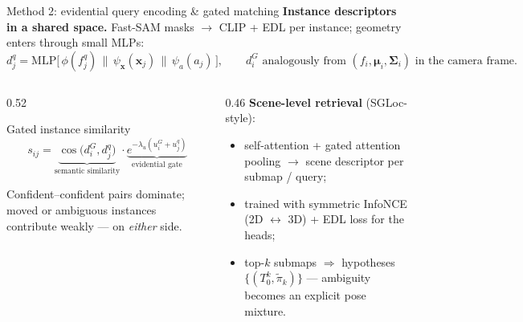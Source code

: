\documentclass[aspectratio=169,10pt]{beamer}
\begin{document}
\begin{frame}{Method 2: evidential query encoding \& gated matching}
  \textbf{Instance descriptors in a shared space.} Fast-SAM masks
  $\rightarrow$ CLIP + EDL per instance; geometry enters through small MLPs:
  \begin{equation*}
    d_j^q = \mathrm{MLP}\big[\,\phi(f_j^q) \,\|\, \psi_{\mathbf{x}}(\mathbf{x}_j)
    \,\|\, \psi_a(a_j)\,\big],
    \qquad
    d_i^G \text{ analogously from } (f_i, \bm\mu_i, \bm\Sigma_i)
    \text{ in the camera frame.}
  \end{equation*}
  \begin{columns}[T]
    \begin{column}{0.52\textwidth}
      \begin{block}{Gated instance similarity}
        \begin{equation*}
          s_{ij} =
          \underbrace{\cos\!\big(d_i^G, d_j^q\big)}_{\text{semantic similarity}}
          \cdot
          \underbrace{e^{-\lambda_u (u_i^G + u_j^q)}}_{\text{evidential gate}}
        \end{equation*}
      \end{block}
      \small Confident--confident pairs dominate; moved or ambiguous
      instances contribute weakly --- on \emph{either} side.
    \end{column}
    \begin{column}{0.46\textwidth}
      \textbf{Scene-level retrieval} (SGLoc-style):
      \begin{itemize}\small
        \item self-attention + gated attention pooling
              $\rightarrow$ scene descriptor per submap / query;
        \item trained with symmetric InfoNCE (2D $\leftrightarrow$ 3D)
              + EDL loss for the heads;
        \item top-$k$ submaps $\Rightarrow$ hypotheses
              $\{(T_0^k, \tilde\pi_k)\}$ --- ambiguity becomes an explicit
              \alert{pose mixture}.
      \end{itemize}
    \end{column}
  \end{columns}
\end{frame}
\end{document}
